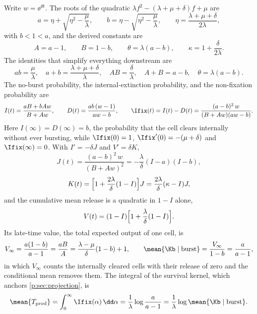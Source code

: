 Write $w=\ee^{\theta t}$. The roots of the quadratic
$\lambda f^2-(\lambda+\mu+\delta)f+\mu$ are
\begin{equation}
a=\eta+\sqrt{\eta^2-\frac{\mu}{\lambda}},\qquad
b=\eta-\sqrt{\eta^2-\frac{\mu}{\lambda}},\qquad
\eta=\frac{\lambda+\mu+\delta}{2\lambda},
\label{p:eq:roots}
\end{equation}
with $b<1<a$, and the derived constants are
\begin{equation}
A=a-1,\qquad B=1-b,\qquad \theta=\lambda(a-b),\qquad \kappa=1+\frac{\delta}{2\lambda}.
\label{p:eq:derived}
\end{equation}
The identities that simplify everything downstream are
\begin{equation}
ab=\frac{\mu}{\lambda},\quad a+b=\frac{\lambda+\mu+\delta}{\lambda},\quad
AB=\frac{\delta}{\lambda},\quad A+B=a-b,\quad \theta=\lambda(a-b).
\label{p:eq:AB}
\end{equation}
The no-burst probability, the internal-extinction probability, and the
non-fixation probability are
\begin{equation}
I(t)=\frac{aB+bAw}{B+Aw},\qquad
D(t)=\frac{ab\,(w-1)}{aw-b},\qquad
\Ifix(t)=I(t)-D(t)=\frac{(a-b)^2\,w}{(B+Aw)(aw-b)}.
\label{p:eq:IDIhat}
\end{equation}
Here $I(\infty)=D(\infty)=b$, the probability that the cell clears
internally without ever bursting, while $\Ifix(0)=1$,
$\Ifix'(0)=-(\mu+\delta)$ and $\Ifix(\infty)=0$. With $I'=-\delta J$ and
$V'=\delta K$,
\begin{equation}
J(t)=\frac{(a-b)^2\,w}{(B+Aw)^2}=-\frac{\lambda}{\delta}(I-a)(I-b),
\label{p:eq:J}
\end{equation}
\begin{equation}
K(t)=\Bigl[1+\frac{2\lambda}{\delta}(1-I)\Bigr]J
=\frac{2\lambda}{\delta}(\kappa-I)J,
\label{p:eq:K}
\end{equation}
and the cumulative mean release is a quadratic in $1-I$ alone,
\begin{equation}
V(t)=(1-I)\Bigl[1+\frac{\lambda}{\delta}(1-I)\Bigr].
\label{p:eq:V}
\end{equation}
Its late-time value, the total expected output of one cell, is
\begin{equation}
V_\infty=\frac{a(1-b)}{a-1}=\frac{aB}{A}
=\frac{\lambda-\mu}{\delta}(1-b)+1,
\qquad
\mean{\Kb\mid\text{burst}}=\frac{V_\infty}{1-b}=\frac{a}{a-1},
\label{p:eq:Vinf}
\end{equation}
in which $V_\infty$ counts the internally cleared cells with their release
of zero and the conditional mean removes them. The integral of the survival
kernel, which anchors \cref{p:sec:projection}, is
\begin{equation}
\mean{T_{\rm prod}}=\int_0^\infty\Ifix(\alpha)\,\dd\alpha
=\frac{1}{\lambda}\log\frac{a}{a-1}
=\frac{1}{\lambda}\log\mean{\Kb\mid\text{burst}}.
\label{p:eq:lifetime}
\end{equation}

